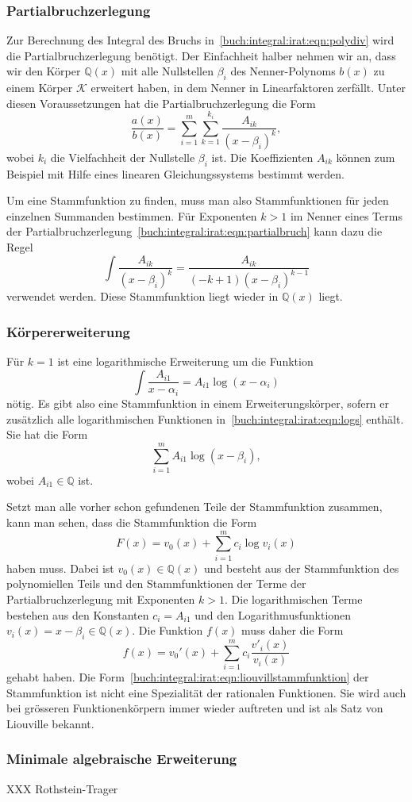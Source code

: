 \subsubsection{Partialbruchzerlegung}
Zur Berechnung des Integral des Bruchs
in~\eqref{buch:integral:irat:eqn:polydiv} wird die Partialbruchzerlegung
benötigt.
Der Einfachheit halber nehmen wir an, dass wir den Körper $\mathbb{Q}(x)$
mit alle Nullstellen $\beta_i$ des Nenner-Polynoms $b(x)$ zu einem Körper
$\mathscr{K}$ erweitert haben, in dem Nenner in Linearfaktoren zerfällt.
Unter diesen Voraussetzungen hat die Partialbruchzerlegung die Form
\begin{equation}
\frac{a(x)}{b(x)}
=
\sum_{i=1}^m
\sum_{k=1}^{k_i}
\frac{A_{ik}}{(x-\beta_i)^k},
\label{buch:integral:irat:eqn:partialbruch}
\end{equation}
wobei $k_i$ die Vielfachheit der Nullstelle $\beta_i$ ist.
Die Koeffizienten $A_{ik}$ können zum Beispiel mit Hilfe eines linearen
Gleichungssystems bestimmt werden.

Um eine Stammfunktion zu finden, muss man also Stammfunktionen für
jeden einzelnen Summanden bestimmen.
Für Exponenten $k>1$ im Nenner eines Terms der
Partialbruchzerlegung~\eqref{buch:integral:irat:eqn:partialbruch}
kann dazu die Regel
\[
\int \frac{A_{ik}}{(x-\beta_i)^k}
=
\frac{A_{ik}}{(-k+1)(x-\beta_i)^{k-1}}
\]
verwendet werden.
Diese Stammfunktion liegt wieder in $\mathbb{Q}(x)$ liegt.

%
%
\subsubsection{Körpererweiterung}
Für $k=1$ ist eine logarithmische Erweiterung um die Funktion
\begin{equation}
\int \frac{A_{i1}}{x-\alpha_i}
=
A_{i1}
\log(x-\alpha_i)
\label{buch:integral:irat:eqn:logs}
\end{equation}
nötig.
Es gibt also eine Stammfunktion in einem Erweiterungskörper, sofern
er zusätzlich alle logarithmischen Funktionen
in~\ref{buch:integral:irat:eqn:logs} enthält.
Sie hat die Form
\[
\sum_{i=1}^m A_{i1} \log(x-\beta_i),
\]
wobei $A_{i1}\in\mathbb{Q}$ ist.

Setzt man alle vorher schon gefundenen Teile der Stammfunktion zusammen,
kann man sehen, dass die Stammfunktion die Form
\begin{equation}
F(x) = v_0(x) + \sum_{i=1}^m c_i \log v_i(x)
\label{buch:integral:irat:eqn:liouvillstammfunktion}
\end{equation}
haben muss.
Dabei ist $v_0(x)\in\mathbb{Q}(x)$ und besteht aus der Stammfunktion
des polynomiellen Teils und den Stammfunktionen der Terme der Partialbruchzerlegung mit Exponenten $k>1$.
Die logarithmischen Terme bestehen aus den Konstanten $c_i=A_{i1}$ 
und den Logarithmusfunktionen $v_i(x)=x-\beta_i\in\mathbb{Q}(x)$.
Die Funktion $f(x)$ muss daher die Form
\[
f(x)
=
v_0'(x)
+
\sum_{i=1}^m c_i\frac{v'_i(x)}{v_i(x)}
\]
gehabt haben.
Die Form~\eqref{buch:integral:irat:eqn:liouvillstammfunktion}
der Stammfunktion ist nicht eine Spezialität der rationalen Funktionen.
Sie wird auch bei grösseren Funktionenkörpern immer wieder auftreten
und ist als Satz von Liouville bekannt.

%
%
\subsubsection{Minimale algebraische Erweiterung}
XXX Rothstein-Trager

